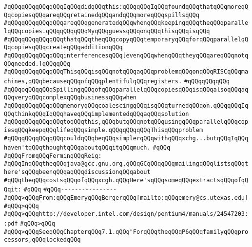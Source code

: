 \verb|#qQQqqQQqqQQqqQQqIqQQqdidqQQqthis:qQQqqQQqIqQQqfoundqQQqthatqQQqmoreqQQqcopiesqQQqareqQQqretainedqQQqandqQQqmoreqQQqspillsqQQq|\newline
\verb|#qQQqqQQqqQQqqQQqareqQQqgeneratedqQQqwhenqQQqkeepingqQQqtheqQQqparallelqQQqcopies.qQQqqQQqqQQqMyqQQqguessqQQqonqQQqthisqQQqisqQQq|\newline
\verb|#qQQqqQQqqQQqqQQqthatqQQqtheqQQqcopyqQQqtemporaryqQQqforqQQqparallelqQQqcopiesqQQqcreateqQQqadditionqQQq|\newline
\verb|#qQQqqQQqqQQqqQQqinterferencesqQQq[evenqQQqwhenqQQqtheyqQQqareqQQqnotqQQqneeded.]qQQqqQQq|\newline
\verb|#qQQqqQQqqQQqqQQqThisqQQqisqQQqnotqQQqaqQQqproblemqQQqonqQQqRISCqQQqmachines,qQQqbecauseqQQqofqQQqplentifulqQQqregisters.|\newline
\verb|#qQQqqQQqqQQq|\newline
\verb|#qQQqoqQQqqQQqSpillingqQQqofqQQqparallelqQQqcopiesqQQqisqQQqalsoqQQqaqQQqveryqQQqcomplexqQQqbusinessqQQqwhen|\newline
\verb|#qQQqqQQqqQQqqQQqmemoryqQQqcoalescingqQQqisqQQqturnedqQQqon.qQQqqQQqIqQQqthinkqQQqIqQQqhaveqQQqimplementedqQQqaqQQqsolution|\newline
\verb|#qQQqqQQqqQQqqQQqtoqQQqthis,qQQqbutqQQqnotqQQqusingqQQqparallelqQQqcopiesqQQqkeepqQQqlifeqQQqsimple.qQQqqQQqqQQqThisqQQqproblem|\newline
\verb|#qQQqqQQqqQQqqQQqcouldqQQqbeqQQqsimplerqQQqwithqQQqxchg...butqQQqIqQQqhaven'tqQQqthoughtqQQqaboutqQQqitqQQqmuch.|\newline
\verb|#qQQq|\newline
\verb|#qQQqFromqQQqFerminqQQqReig:|\newline
\verb|#qQQqInqQQqtheqQQqjava@gcc.gnu.org,qQQqGCqQQqqQQqmailingqQQqlistsqQQqthere'sqQQqbeenqQQqaqQQqdiscussionqQQqabout|\newline
\verb|#qQQqtheqQQqcostsqQQqofqQQqxcgh.qQQqHere'sqQQqsomeqQQqextractsqQQqofqQQqit:|\newline
\verb|#qQQq|\newline
\verb|#qQQq----------------|\newline
\verb|#qQQq>qQQqFrom:qQQqEmeryqQQqBergerqQQq[mailto:qQQqemery@cs.utexas.edu]|\newline
\verb|#qQQq>qQQq|\newline
\verb|#qQQq>qQQqhttp://developer.intel.com/design/pentium4/manuals/24547203::pdf|\newline
\verb|#qQQq>qQQq|\newline
\verb|#qQQq>qQQqSeeqQQqChapterqQQq7.1.qQQq"ForqQQqtheqQQqP6qQQqfamilyqQQqprocessors,qQQqlockedqQQq|\newline

